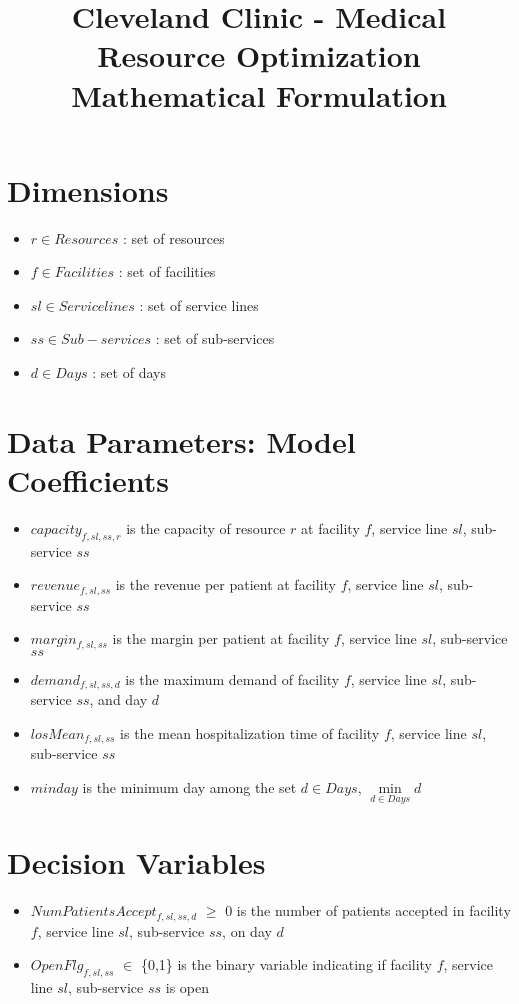 \documentclass[10pt, letterpaper]{article}
\begin{document}
\title{Cleveland Clinic - Medical Resource Optimization Mathematical Formulation}
\maketitle


\section*{Dimensions}
\begin{itemize}
\item[ ] $ r \in Resources$ : set of resources
\item[ ] $ f \in Facilities$ : set of facilities
\item[ ] $ sl \in Service lines$ : set of service lines
\item[ ] $ ss \in Sub-services$ : set of sub-services
\item[ ] $ d \in Days$ : set of days
\end{itemize}

\section*{Data Parameters: Model Coefficients}
\begin{itemize}
\item[ ] $capacity_{f,sl,ss,r}$  is the capacity of resource $r$ at facility $f$, service line $sl$, sub-service $ss$
\item[ ] $revenue_{f,sl,ss}$  is the revenue per patient at facility $f$, service line $sl$, sub-service $ss$
\item[ ] $margin_{f,sl,ss}$  is the margin per patient at facility $f$, service line $sl$, sub-service $ss$
\item[ ] $demand_{f,sl,ss,d}$  is the maximum demand of facility $f$, service line $sl$, sub-service $ss$, and day $d$
\item[ ] $losMean_{f,sl,ss}$  is the mean hospitalization time of facility $f$, service line $sl$, sub-service $ss$
\item[ ] $minday$ is the minimum day among the set $ d \in Days$, ${\min\limits_{d \in Days} d}$
\end{itemize}

\section*{Decision Variables}
\begin{itemize}
\item [ ] $NumPatientsAccept_{f,sl,ss,d}$ $\geq$ {0} is the number of patients accepted in facility $f$, service line $sl$, sub-service $ss$, on day $d$
\item [ ] $OpenFlg_{f,sl,ss}$ $\in$ \{0,1\} is the binary variable indicating if facility $f$, service line $sl$, sub-service $ss$ is open
\end{itemize}
\end{document}

